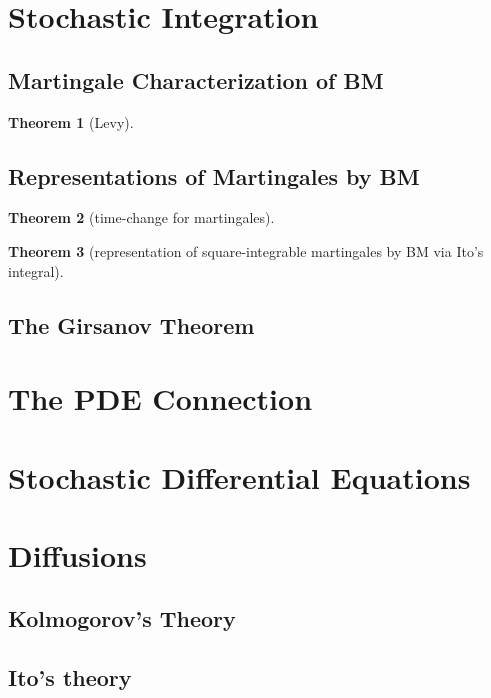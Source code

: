\documentclass{article}
\newtheorem{Thm}{Theorem}[section]
\theoremstyle{definition}
\begin{document}
\section{Stochastic Integration}
\subsection{}


\subsection{Martingale Characterization of BM}
\begin{Thm}[Levy]
    
\end{Thm}

\subsection{Representations of Martingales by BM}


\begin{Thm}[time-change for martingales]
    
\end{Thm}


\begin{Thm}[representation of square-integrable martingales by BM via Ito's integral]
    
\end{Thm}

\subsection{The Girsanov Theorem}


\section{The PDE Connection}




\section{Stochastic Differential Equations}




\section{Diffusions}

\subsection{Kolmogorov's Theory}


\subsection{Ito's theory}
\end{document}
